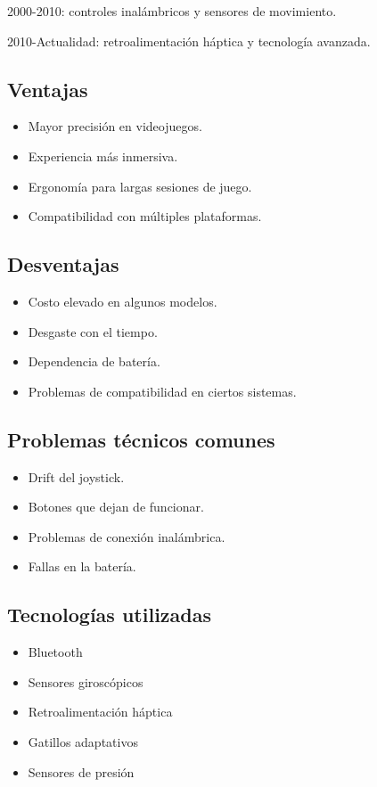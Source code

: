 \documentclass[12pt, letterpaper]{article}
\begin{document}
2000-2010: controles inalámbricos y sensores de movimiento.

2010-Actualidad: retroalimentación háptica y tecnología avanzada.

\subsection{Ventajas}

\begin{itemize}
\item Mayor precisión en videojuegos.
\item Experiencia más inmersiva.
\item Ergonomía para largas sesiones de juego.
\item Compatibilidad con múltiples plataformas.
\end{itemize}

\subsection{Desventajas}

\begin{itemize}
\item Costo elevado en algunos modelos.
\item Desgaste con el tiempo.
\item Dependencia de batería.
\item Problemas de compatibilidad en ciertos sistemas.
\end{itemize}

\subsection{Problemas técnicos comunes}

\begin{itemize}
\item Drift del joystick.
\item Botones que dejan de funcionar.
\item Problemas de conexión inalámbrica.
\item Fallas en la batería.
\end{itemize}

\subsection{Tecnologías utilizadas}

\begin{itemize}
\item Bluetooth
\item Sensores giroscópicos
\item Retroalimentación háptica
\item Gatillos adaptativos
\item Sensores de presión
\end{itemize}
\end{document}
